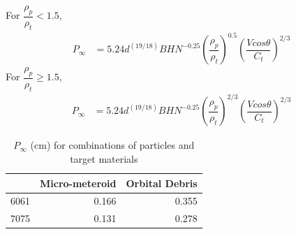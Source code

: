 \documentclass[onecolumn,10pt]{jhwhw}
\begin{document}
\noindent For $\dfrac{\rho_p}{\rho_t} < 1.5,$
\begin{align*}
P_{\infty} &= 5.24 d^{(19/18)} BHN^{-0.25} \left(\dfrac{\rho_p}{\rho_t}\right)^{0.5} \left(\dfrac{V cos \theta}{C_t}\right)^{2/3}
\end{align*}
For $\dfrac{\rho_p}{\rho_t} \geq 1.5,$
\begin{align*}
P_{\infty} &= 5.24 d^{(19/18)} BHN^{-0.25} \left(\dfrac{\rho_p}{\rho_t}\right)^{2/3} \left(\dfrac{V cos \theta}{C_t}\right)^{2/3}
\end{align*}

\begin{table}[h]
\begin{center}
\begin{tabular}{r|rr}
\toprule
      &   Micro-meteroid &   Orbital Debris \\
\midrule
 6061 &            0.166 &            0.355 \\
 7075 &            0.131 &            0.278 \\
\bottomrule
\end{tabular}
\end{center}
\caption{$P_{\infty}$ (cm) for combinations of particles and target materials}
\end{table}
\end{document}
